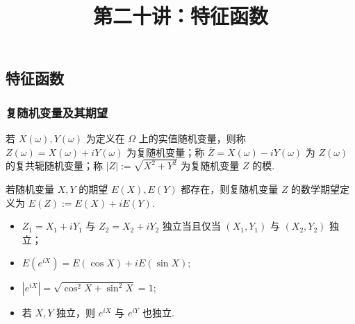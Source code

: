 \documentclass[Prob-All.tex]{subfiles}
\begin{document}
\title[概率论]{第二十讲：特征函数}
\date{}

{ 
	\begin{frame}
		\titlepage
	\end{frame}
}



\subsection{特征函数}
\begin{frame}
	\frametitle{复随机变量及其期望}
	\begin{defi}
		若 $X (\omega),Y (\omega)$ 为定义在 $\Omega$ 上的实值随机变量，则称 $Z (\omega)=X (\omega)+iY (\omega)$ 为复随机变量；称 $\overline{Z}=X (\omega)-iY (\omega)$ 为 $Z (\omega)$ 的复共轭随机变量；称 $|Z|:=\sqrt{X^2+Y^2}$ 为复随机变量 $Z$ 的模.
	\end{defi}
	\pause
	\begin{defi}
		若随机变量 $X,Y$ 的期望 $E (X),E (Y)$ 都存在，则复随机变量 $Z$ 的数学期望定义为 $E (Z):=E (X)+iE (Y)$.
	\end{defi}

	\pause
	\begin{itemize}[<+-|alert@+>]
		\item $Z_1=X_1+iY_1$ 与 $Z_2=X_2+iY_2$ 独立当且仅当 $(X_1,Y_1)$ 与 $(X_2,Y_2)$ 独立；
		\item $E(e^{iX})=E(\cos X)+i E(\sin X)$;
		\item $|e^{iX}|=\sqrt{\cos^2 X+\sin^2 X}=1$;
		\item 若 $X,Y$ 独立，则 $e^{iX}$ 与 $e^{iY}$ 也独立.
	\end{itemize}

\end{frame}
\end{document}
